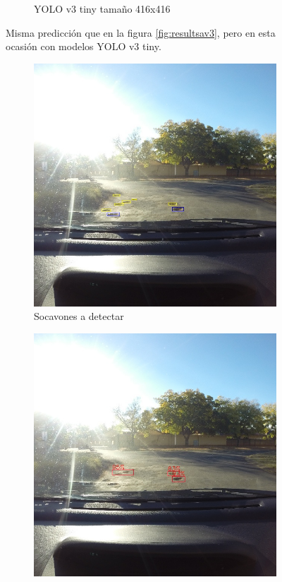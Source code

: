 \begin{figure}[H]
\begin{subfigure}[h]{0.45\linewidth}
		\caption{YOLO v3 tiny tamaño 416x416}
	\end{subfigure}
	\caption{Misma predicción que en la figura \ref{fig:resultsav3}, pero en esta ocasión con modelos YOLO v3 tiny.}
	\label{fig:resultsav3tiny}
\end{figure}

\begin{figure}[H]
	\centering
	\begin{subfigure}[h]{0.45\linewidth}
		\includegraphics[width=\linewidth]{images/results_b_gt.jpg}
		\caption{Socavones a detectar}
	\end{subfigure}
	\begin{subfigure}[h]{0.45\linewidth}
		\includegraphics[width=\linewidth]{images/results_b_yolo_v3_256.jpg}

\end{subfigure}
\end{figure}

